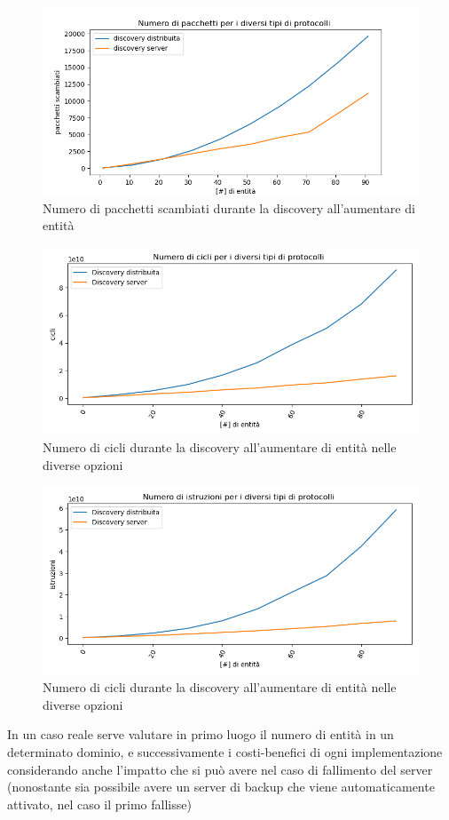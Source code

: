 \begin{figure}[H]
    \includegraphics[width=\textwidth]{./results/test0_packet.png} 
    \caption{Numero di pacchetti scambiati durante la discovery all'aumentare di entità} %
    \label{fig:test0pack}
\end{figure}
\begin{figure}[H]
    \includegraphics[width=\textwidth]{./results/test0_cicli.png} 
    \caption{Numero di cicli durante la discovery all'aumentare di entità nelle diverse opzioni} %
    \label{fig:test0cicl}
\end{figure}
\begin{figure}[H]
    \includegraphics[width=\textwidth]{./results/test0_istruzioni.png} 
    \caption{Numero di cicli durante la discovery all'aumentare di entità nelle diverse opzioni} %
    \label{fig:test0_instr}
\end{figure}
In un caso reale serve valutare in primo luogo il numero di entità in un determinato dominio, e successivamente i costi-benefici di ogni implementazione considerando anche l'impatto che si può avere nel caso di fallimento del server (nonostante sia possibile avere un server di backup che viene automaticamente attivato, nel caso il primo fallisse)

